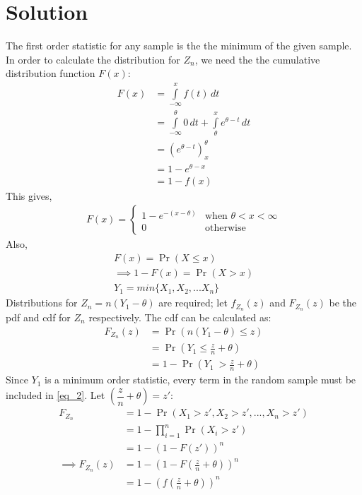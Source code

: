 \documentclass[journal,12pt,twocolumn]{IEEEtran}
\providecommand{\pr}[1]{\ensuremath{\Pr\left(#1\right)}}
\providecommand{\brak}[1]{\ensuremath{\left(#1\right)}}
\theoremstyle{remark}
\numberwithin{equation}{subsection}
\begin{document}
\section{\textbf{Solution}}
The first order statistic for any sample is the the minimum of the given sample. In order to calculate the distribution for $Z_n$, we need the the cumulative distribution function $F(x)$:\\
\begin{align}
  F(x) &=\displaystyle\int\limits_{-\infty}^{x} f(t) \,dt\\
  &= \displaystyle\int\limits_{-\infty}^{\theta}0\,dt + \displaystyle\int\limits_{\theta}^{x}e^{\theta-t}\,dt\\
  &=\brak{e^{\theta-t}}_{x}^{\theta}\\
  &= 1-e^{\theta-x} \\
  &= 1-f(x) \label{eq_1}
\end{align}
This gives,
\begin{align}
    F(x) = 
    \begin{cases}
    1-e^{-(x-\theta)} &\text{when }\theta<x<\infty\\
    0 &\text{otherwise}
    \end{cases}
\end{align}
Also,
\begin{align}
    F(x) = \pr{X\leq x}\\
    \implies 1-F(x) = \pr{X>x}\\
    Y_1 = \textit{min}\{X_1, X_2, ... X_n\}
\end{align}
Distributions for $Z_n = n(Y_1-\theta)$ are required; let $f_{Z_n}(z)$ and $F_{Z_n}(z)$ be the pdf and cdf for $Z_n$ respectively. The cdf can be calculated as: 
\begin{align}
    F_{Z_n}(z) &= \pr{n(Y_1-\theta)\leq z}\\
    &= \pr{Y_1\leq \frac{z}{n} +\theta}\\
    &= 1-\pr{Y_1\ > \frac{z}{n} +\theta}\label{eq_2}
\end{align}
Since $Y_1$ is a minimum order statistic, every term in the random sample must be included in \eqref{eq_2}. Let $\brak{\dfrac{z}{n}+\theta} = z'$:
\begin{align}
    F_{Z_n}&= 1-\pr{X_1>z', X_2>z', ..., X_n>z'}\nonumber\\
    &= 1-\prod_{i=1}^{n}\pr{X_i>z'}\nonumber\\
    &= 1-\brak{1-F(z')}^n\nonumber\\
    \implies F_{Z_n}(z) &= 1-\brak{1-F\brak{\frac{z}{n}+\theta}}^n\label{eq_3}\\
    &=1-\brak{f\brak{\frac{z}{n}+\theta}}^n 
\end{align}
\end{document}
